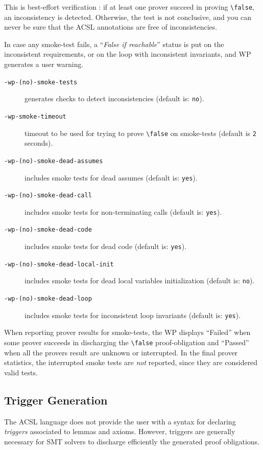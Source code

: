 This is best-effort verification : if at least one prover succeed in proving \verb+\false+,
an inconsistency is detected. Otherwise, the test is not conclusive, and you can never be sure
that the ACSL annotations are free of inconsistencies.

In case any smoke-test fails, a ``\textit{False if reachable}'' status is put on the
inconsistent requirements, or on the loop with inconsistent invariants, and
\textsf{WP} generates a user warning.

\begin{description}
\item[\tt -wp-(no)-smoke-tests] generates checks to detect inconsistencies
  (default is: \texttt{no}).
\item[\tt -wp-smoke-timeout] timeout to be used for trying to prove \verb+\false+
  on smoke-tests (default is \verb+2+ seconds).
\item[\tt -wp-(no)-smoke-dead-assumes] includes smoke tests for dead assumes
  (default is: \texttt{yes}).
\item[\tt -wp-(no)-smoke-dead-call] includes smoke tests for non-terminating
  calls (default is: \texttt{yes}).
\item[\tt -wp-(no)-smoke-dead-code] includes smoke tests for dead code (default
  is: \texttt{yes}).
\item[\tt -wp-(no)-smoke-dead-local-init] includes smoke tests for dead local
  variables initialization (default is: \texttt{no}).
\item[\tt -wp-(no)-smoke-dead-loop] includes smoke tests for inconsistent loop
  invariants (default is: \texttt{yes}).
\end{description}

When reporting prover results for smoke-tests, the \textsf{WP} displays
``Failed'' when some prover succeeds in discharging the \verb+\false+ proof-obligation
and ``Passed'' when all the provers result are unknown or interrupted.
In the final prover statistics, the interrupted smoke tests are \emph{not} reported, since
they are considered valid tests.

\subsection{Trigger Generation}
\label{triggers}

The \textsf{ACSL} language does not provide the user with a syntax for
declaring \emph{triggers} associated to lemmas and axioms. However,
triggers are generally necessary for \textsf{SMT} solvers to discharge
efficiently the generated proof obligations.

